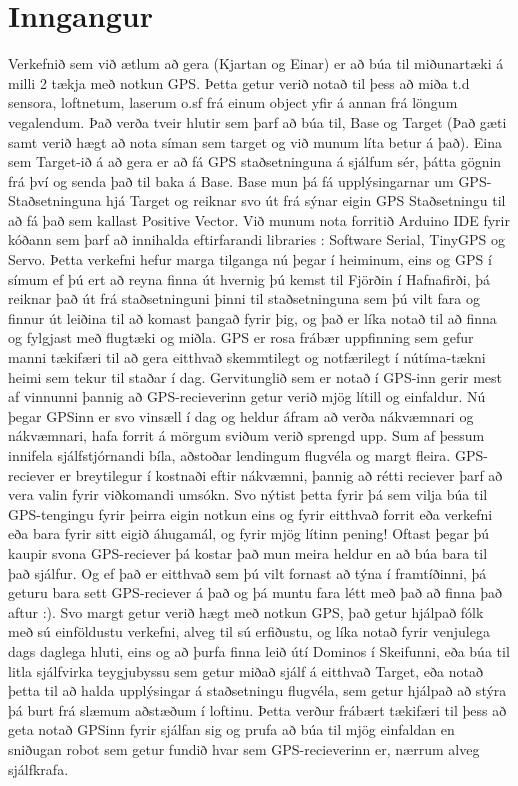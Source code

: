 \section{Inngangur}
Verkefnið sem við ætlum að gera (Kjartan og Einar) er að búa til miðunartæki á milli 2 tækja með notkun GPS. Þetta getur verið notað til þess að miða t.d sensora, loftnetum, laserum o.sf frá einum object yfir á annan frá löngum vegalendum. Það verða tveir hlutir sem þarf að búa til, Base og Target (Það gæti samt verið hægt að nota síman sem target og við munum líta betur á það). Eina sem Target-ið á að gera er að fá GPS staðsetninguna á sjálfum sér, þátta gögnin frá því og senda það til baka á Base. Base mun þá fá upplýsingarnar um GPS-Staðsetninguna hjá Target og reiknar svo út frá sýnar eigin GPS Staðsetningu til að fá það sem kallast Positive Vector. Við munum nota forritið Arduino IDE fyrir kóðann sem þarf að innihalda eftirfarandi libraries : Software Serial, TinyGPS og Servo. Þetta verkefni hefur marga tilganga nú þegar í heiminum, eins og GPS í símum ef þú ert að reyna finna út hvernig þú kemst til Fjörðin í Hafnafirði, þá reiknar það út frá staðsetninguni þinni til staðsetninguna sem þú vilt fara og finnur út leiðina til að komast þangað fyrir þig, og það er líka notað til að finna og fylgjast með flugtæki og miðla. GPS er rosa frábær uppfinning sem gefur manni tækifæri til að gera eitthvað skemmtilegt og notfærilegt í nútíma-tækni heimi sem tekur til staðar í dag. Gervitunglið sem er notað í GPS-inn gerir mest af vinnunni þannig að GPS-recieverinn getur verið mjög lítill og einfaldur. Nú þegar GPSinn er svo vinsæll í dag og heldur áfram að verða nákvæmnari og nákvæmnari, hafa forrit á mörgum sviðum verið sprengd upp. Sum af þessum innifela sjálfstjórnandi bíla, aðstoðar lendingum flugvéla og margt fleira. GPS-reciever er breytilegur í kostnaði eftir nákvæmni, þannig að rétti reciever þarf að vera valin fyrir viðkomandi umsókn. Svo nýtist þetta fyrir þá sem vilja búa til GPS-tengingu fyrir þeirra eigin notkun eins og fyrir eitthvað forrit eða verkefni eða bara fyrir sitt eigið áhugamál, og fyrir mjög lítinn pening! Oftast þegar þú kaupir svona GPS-reciever þá kostar það mun meira heldur en að búa bara til það sjálfur. Og ef það er eitthvað sem þú vilt fornast að týna í framtíðinni, þá geturu bara sett GPS-reciever á það og þá muntu fara létt með það að finna það aftur :). Svo margt getur verið hægt með notkun GPS, það getur hjálpað fólk með sú einföldustu verkefni, alveg til sú erfiðustu, og líka notað fyrir venjulega dags daglega hluti, eins og að þurfa finna leið útí Dominos í Skeifunni, eða búa til litla sjálfvirka teygjubyssu sem getur miðað sjálf á eitthvað Target, eða notað þetta til að halda upplýsingar á staðsetningu flugvéla, sem getur hjálpað að stýra þá burt frá slæmum aðstæðum í loftinu. Þetta verður frábært tækifæri til þess að geta notað GPSinn fyrir sjálfan sig og prufa að búa til mjög einfaldan en sniðugan robot sem getur fundið hvar sem GPS-recieverinn er, nærrum alveg sjálfkrafa.
